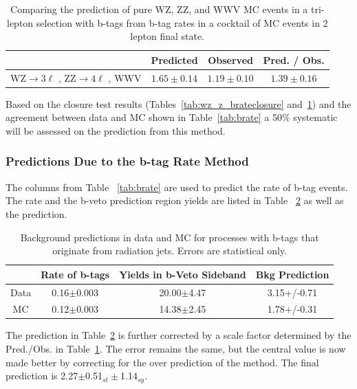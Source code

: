 \begin{table}[ht!]
\begin{center}
\caption{\small \label{tab:mcsoup_brateclosure} Comparing the prediction of pure WZ, ZZ, and WWV MC events in a tri-lepton selection with b-tags from b-tag rates in a cocktail of MC events in 2 lepton final state.}
\begin{tabular}{c|ccc}\hline
                                                                                               & Predicted             & Observed          & Pred. / Obs.\\
\hline \hline
WZ$\rightarrow 3\ell $ , ZZ$\rightarrow 4\ell $ , WWV & $1.65 \pm 0.14$ & $1.19\pm0.10$ & $1.39 \pm 0.16$ \\
\hline
\end{tabular}
\end{center}
\end{table}

Based on the closure test results (Tables~\ref{tab:wz_z_brateclosure} and~\ref{tab:mcsoup_brateclosure}) and the agreement between data and MC shown in Table~\ref{tab:brate} a 50\% systematic will be assessed on the prediction from this method.\\
		
		
        		\subsubsection{Predictions Due to the b-tag Rate Method}
		The columns from Table ~\ref{tab:brate} are used to predict the rate of b-tag events. The rate and the b-veto prediction region yields are listed in Table ~\ref{tab:brate_prediction} as well as the prediction.
\begin{table}[ht!]
\begin{center}
\caption{\small \label{tab:brate_prediction} Background predictions in data and MC for processes with b-tags that originate from radiation jets. Errors are statistical only.}
\begin{tabular}{c|ccc}\hline
	   & Rate of b-tags	& Yields in b-Veto Sideband &	Bkg Prediction \\ \hline
Data   & 0.16$\pm$0.003	& 20.00$\pm$4.47            & 3.15+/-0.71 \\
MC	   & 0.12$\pm$0.003	& 14.38$\pm$2.45            & 1.78+/-0.31 \\
\hline
\end{tabular}
\end{center}
\end{table}

The prediction in Table~\ref{tab:brate_prediction} is further corrected by a scale factor determined by the Pred./Obs. in Table~\ref{tab:mcsoup_brateclosure}. The error remains the same, but the central value is now made better by correcting for the over prediction of the method. The final prediction is 2.27$\pm$0.51$_{st} \pm$1.14$_{sy}$.
		